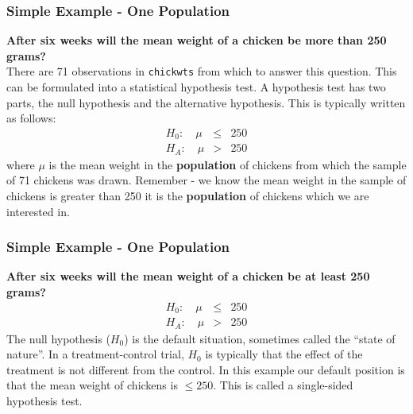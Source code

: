 \documentclass{beamer}\usepackage[]{graphicx}\usepackage[]{color}
\begin{document}
{{{%

\begin{frame}
\frametitle{Simple Example - One Population}
{\bfseries After six weeks will the mean weight of a chicken be more than 250
grams?}\\
There are 71 observations in \texttt{chickwts} from which to answer this
question. This can be formulated into a statistical hypothesis test. A
hypothesis test has two parts, the null hypothesis and the alternative
hypothesis. This is typically written as follows:
\begin{eqnarray}
H_0:\quad \mu &\le& 250 \nonumber\\
H_A:\quad \mu &>& 250 \nonumber
\end{eqnarray}
where $\mu$ is the mean weight in the {\bfseries population} of
chickens from which the sample of 71 chickens was drawn. Remember - we know the
mean weight in the sample of chickens is greater than 250 it is the
{\bfseries population} of chickens which we are interested in.
\end{frame}


\begin{frame}
\frametitle{Simple Example - One Population}
{\bfseries After six weeks will the mean weight of a chicken be at least 250 grams?}
\begin{eqnarray}
H_0:\quad \mu &\le& 250 \nonumber\\
H_A:\quad \mu &>& 250 \nonumber
\end{eqnarray}
The null hypothesis ($H_0$) is the default situation, sometimes called the
``state of nature''. In a treatment-control trial, $H_0$ is typically that
the effect of the treatment is not different from the control. In this
example our default position is that the mean weight of chickens is
{\bfseries $\le{250}$}. This is called a single-sided hypothesis test.
\end{frame}


}}}
\end{document}
